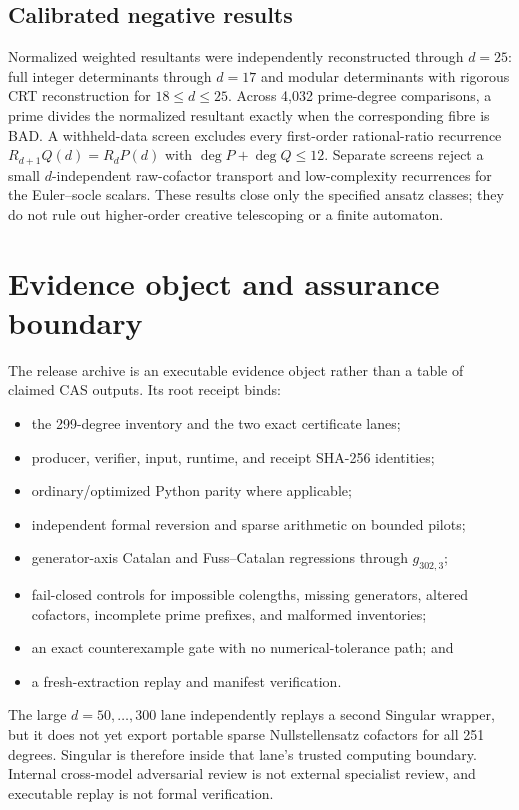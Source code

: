 \documentclass[11pt]{article}
\theoremstyle{definition}
\begin{document}
\subsection{Calibrated negative results}

Normalized weighted resultants were independently reconstructed through
$d=25$: full integer determinants through $d=17$ and modular determinants
with rigorous CRT reconstruction for $18\le d\le25$.  Across 4,032
prime-degree comparisons, a prime divides the normalized resultant exactly
when the corresponding fibre is BAD.  A withheld-data screen excludes every
first-order rational-ratio recurrence
$R_{d+1}Q(d)=R_dP(d)$ with $\deg P+\deg Q\le12$.  Separate screens reject a
small $d$-independent raw-cofactor transport and low-complexity recurrences for
the Euler--socle scalars.  These results close only the specified ansatz
classes; they do not rule out higher-order creative telescoping or a finite
automaton.

\section{Evidence object and assurance boundary}

The release archive is an executable evidence object rather than a table of
claimed CAS outputs.  Its root receipt binds:
\begin{itemize}
\item the 299-degree inventory and the two exact certificate lanes;
\item producer, verifier, input, runtime, and receipt SHA-256 identities;
\item ordinary/optimized Python parity where applicable;
\item independent formal reversion and sparse arithmetic on bounded pilots;
\item generator-axis Catalan and Fuss--Catalan regressions through $g_{302,3}$;
\item fail-closed controls for impossible colengths, missing generators,
  altered cofactors, incomplete prime prefixes, and malformed inventories;
\item an exact counterexample gate with no numerical-tolerance path; and
\item a fresh-extraction replay and manifest verification.
\end{itemize}

The large $d=50,\ldots,300$ lane independently replays a second Singular
wrapper, but it does not yet export portable sparse Nullstellensatz cofactors
for all 251 degrees.  Singular is therefore inside that lane's trusted
computing boundary.  Internal cross-model adversarial review is not external
specialist review, and executable replay is not formal verification.
\end{document}
